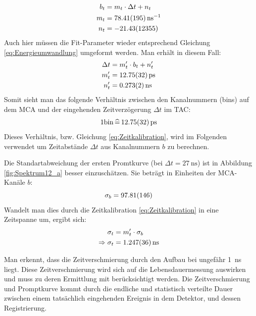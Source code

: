\begin{align*}
    b_t &= m_t \cdot \Delta t + n_t \\
    m_t &= \SI{78,41 \pm 1,95}{\per \nano \second} \\
    n_t &= \SI{-21,43 \pm 123,55}{}
\end{align*}
Auch hier müssen die Fit-Parameter wieder entsprechend Gleichung \ref{eq:Energieumwandlung} umgeformt werden.
Man erhält in diesem Fall:
\begin{align}
    \begin{split}
        \Delta t &= m_t' \cdot b_t + n_t' \\
        m_t' &= \SI{12,75 \pm 0,32}{\pico \second} \\
        n_t' &= \SI{0,273 \pm 0,002}{\nano \second}
    \end{split}
    \label{eq:Zeitkalibration}
\end{align}
Somit sieht man das folgende Verhältnis zwischen den Kanalnummern (bins) auf dem MCA und der eingehenden Zeitverzögerung $\Delta t$ im TAC:
\begin{equation*}
    1 \text{bin} \, \widehat{=} \, \SI{12,75 \pm 0,32}{\pico\second}
    \label{eq:Zeitkalibration2}
\end{equation*}
Dieses Verhältnis, bzw. Gleichung \ref{eq:Zeitkalibration}, wird im Folgenden verwendet um Zeitabstände $\Delta t$ aus Kanalnummern $b$ zu berechnen.

Die Standartabweichung der ersten Promtkurve (bei $\Delta t = \SI{27}{\nano\second}$) ist in Abbildung \ref{fig:Spektrum12_a} besser einzuschätzen.
Sie beträgt in Einheiten der MCA-Kanäle $b$:
\begin{displaymath}
    \sigma_b = \SI{97,81 \pm 1,46}{}
\end{displaymath}
Wandelt man dies durch die Zeitkalibration \ref{eq:Zeitkalibration} in eine Zeitspanne um, ergibt sich:
\begin{align*}
    \sigma_t &= m_t' \cdot \sigma_b \\
    \Rightarrow \sigma_t &= \SI{1,247 \pm 0,036}{\nano \second}
\end{align*}

Man erkennt, dass die Zeitverschmierung durch den Aufbau bei ungefähr \SI{1}{\nano\second} liegt.
Diese Zeitverschmierung wird sich auf die Lebensdauermessung auswirken und muss zu deren Ermittlung mit berücksichtigt werden.
Die Zeitverschmierung und Promptkurve kommt durch die endliche und statistisch verteilte Dauer zwischen einem tatsächlich eingehenden Ereignis in dem Detektor, und dessen Registrierung.

